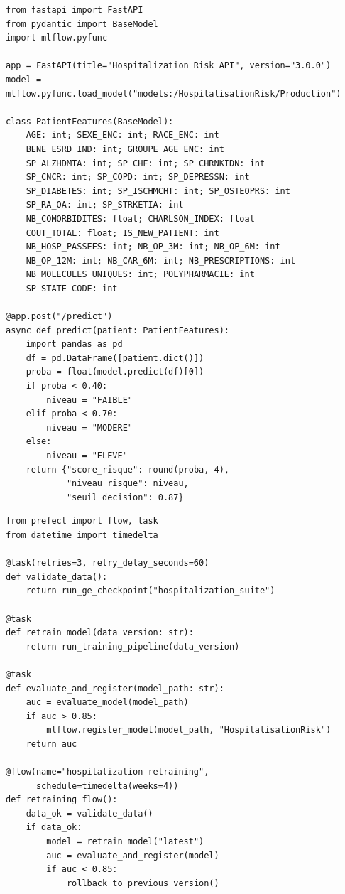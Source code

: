\begin{lstlisting}[caption={Endpoint FastAPI /predict avec schéma Pydantic},
                   label={lst:predict}]
from fastapi import FastAPI
from pydantic import BaseModel
import mlflow.pyfunc

app = FastAPI(title="Hospitalization Risk API", version="3.0.0")
model = mlflow.pyfunc.load_model("models:/HospitalisationRisk/Production")

class PatientFeatures(BaseModel):
    AGE: int; SEXE_ENC: int; RACE_ENC: int
    BENE_ESRD_IND: int; GROUPE_AGE_ENC: int
    SP_ALZHDMTA: int; SP_CHF: int; SP_CHRNKIDN: int
    SP_CNCR: int; SP_COPD: int; SP_DEPRESSN: int
    SP_DIABETES: int; SP_ISCHMCHT: int; SP_OSTEOPRS: int
    SP_RA_OA: int; SP_STRKETIA: int
    NB_COMORBIDITES: float; CHARLSON_INDEX: float
    COUT_TOTAL: float; IS_NEW_PATIENT: int
    NB_HOSP_PASSEES: int; NB_OP_3M: int; NB_OP_6M: int
    NB_OP_12M: int; NB_CAR_6M: int; NB_PRESCRIPTIONS: int
    NB_MOLECULES_UNIQUES: int; POLYPHARMACIE: int
    SP_STATE_CODE: int

@app.post("/predict")
async def predict(patient: PatientFeatures):
    import pandas as pd
    df = pd.DataFrame([patient.dict()])
    proba = float(model.predict(df)[0])
    if proba < 0.40:
        niveau = "FAIBLE"
    elif proba < 0.70:
        niveau = "MODERE"
    else:
        niveau = "ELEVE"
    return {"score_risque": round(proba, 4),
            "niveau_risque": niveau,
            "seuil_decision": 0.87}
\end{lstlisting}

\begin{lstlisting}[caption={Flow Prefect de réentraînement automatique},
                   label={lst:prefect}]
from prefect import flow, task
from datetime import timedelta

@task(retries=3, retry_delay_seconds=60)
def validate_data():
    return run_ge_checkpoint("hospitalization_suite")

@task
def retrain_model(data_version: str):
    return run_training_pipeline(data_version)

@task
def evaluate_and_register(model_path: str):
    auc = evaluate_model(model_path)
    if auc > 0.85:
        mlflow.register_model(model_path, "HospitalisationRisk")
    return auc

@flow(name="hospitalization-retraining",
      schedule=timedelta(weeks=4))
def retraining_flow():
    data_ok = validate_data()
    if data_ok:
        model = retrain_model("latest")
        auc = evaluate_and_register(model)
        if auc < 0.85:
            rollback_to_previous_version()
\end{lstlisting}

